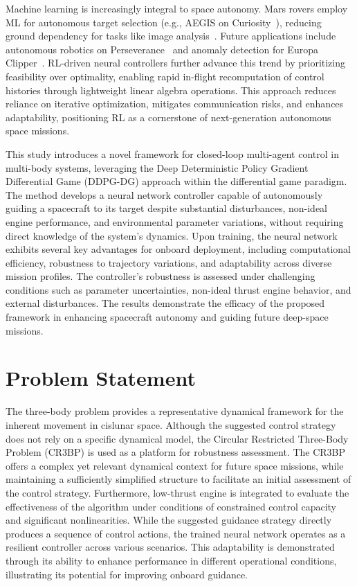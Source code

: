 \documentclass[conference]{IEEEtran}
\begin{document}
Machine learning is increasingly integral to space autonomy. Mars rovers employ ML for autonomous target selection (e.g., AEGIS on Curiosity~\cite{17}), reducing ground dependency for tasks like image analysis~\cite{18}. Future applications include autonomous robotics on Perseverance~\cite{19,20} and anomaly detection for Europa Clipper~\cite{Clipper}. RL-driven neural controllers further advance this trend by prioritizing feasibility over optimality, enabling rapid in-flight recomputation of control histories through lightweight linear algebra operations. This approach reduces reliance on iterative optimization, mitigates communication risks, and enhances adaptability, positioning RL as a cornerstone of next-generation autonomous space missions.

This study introduces a novel framework for closed-loop multi-agent control in multi-body systems, leveraging the Deep Deterministic Policy Gradient Differential Game (DDPG-DG) approach within the differential game paradigm. The method develops a neural network controller capable of autonomously guiding a spacecraft to its target despite substantial disturbances, non-ideal engine performance, and environmental parameter variations, without requiring direct knowledge of the system's dynamics. Upon training, the neural network exhibits several key advantages for onboard deployment, including computational efficiency, robustness to trajectory variations, and adaptability across diverse mission profiles. The controller's robustness is assessed under challenging conditions such as parameter uncertainties, non-ideal thrust engine behavior, and external disturbances. The results demonstrate the efficacy of the proposed framework in enhancing spacecraft autonomy and guiding future deep-space missions.


\section{Problem Statement}
The three-body problem provides a representative dynamical framework for the inherent movement in cislunar space.
Although the suggested control strategy does not rely on a specific dynamical model, the Circular Restricted Three-Body Problem (CR3BP) is used as a platform for robustness assessment.
The CR3BP offers a complex yet relevant dynamical context for future space missions, while maintaining a sufficiently simplified structure to facilitate an initial assessment of the control strategy.
Furthermore, low-thrust engine is integrated to evaluate the effectiveness of the algorithm under conditions of constrained control capacity and significant nonlinearities.
While the suggested guidance strategy directly produces a sequence of control actions, the trained neural network operates as a resilient controller across various scenarios.
This adaptability is demonstrated through its ability to enhance performance in different operational conditions, illustrating its potential for improving onboard guidance.
\end{document}
